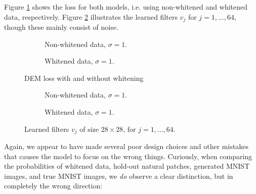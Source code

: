 \documentclass[a4paper]{article}
\theoremstyle{definition}
\theoremstyle{plain}
\begin{document}
Figure \ref{loss_DEM} shows the loss for both models, i.e. using non-whitened and whitened data, respectively. Figure \ref{ex2_filters_fig} illustrates the learned filters $v_j$ for $j = 1,\ldots,64$, though these mainly consist of noise.


\begin{figure}[H]
	\centering
	\begin{subfigure}[b]{0.49\textwidth}
		
		\caption{Non-whitened data, $\sigma = 1$.}
	\end{subfigure}
	\hfill
	\begin{subfigure}[b]{0.49\textwidth}
		
		\caption{Whitened data, $\sigma=1$.}
	\end{subfigure}
	\caption{DEM loss with and without whitening}
	\label{loss_DEM}
\end{figure}


\begin{figure}[H]
\centering
	\begin{subfigure}[b]{0.49\textwidth}
		\centering
		
		\caption{Non-whitened data, $\sigma = 1$.}
	\end{subfigure}
	\hfill
	\begin{subfigure}[b]{0.49\textwidth}
	\centering
		
		\caption{Whitened data, $\sigma = 1$.}
	\end{subfigure}
	\caption{Learned filters $v_j$ of size $28\times28$, for $j = 1,\ldots,64$.}
	\label{ex2_filters_fig}
\end{figure}

Again, we appear to have made several poor design choices and other mistakes that causes the model to focus on the wrong things. Curiously, when comparing the probabilities of whitened data, hold-out natural patches, generated MNIST images, and true MNIST images, we \emph{do} observe a clear distinction, but in completely the wrong direction:
\end{document}

